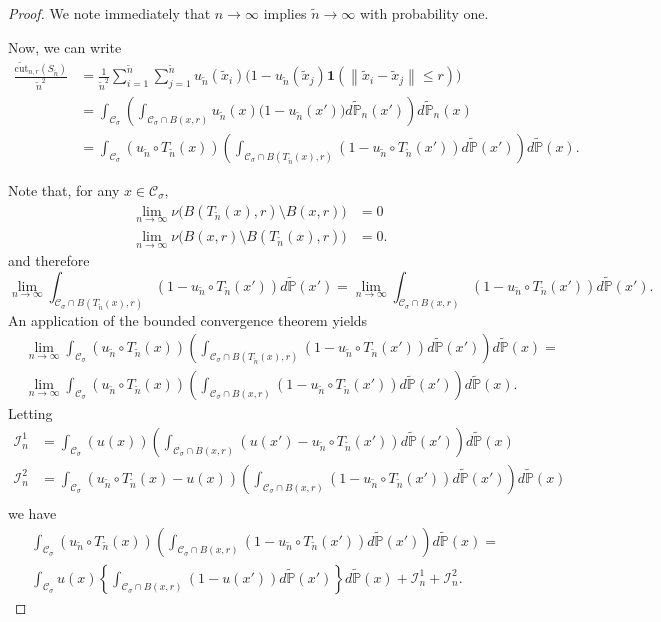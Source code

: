\documentclass{article}
\newcommand{\norm}[1]{\left\lVert#1\right\rVert}
\newcommand{\1}{\mathbf{1}}
\newcommand{\cut}{\mathrm{cut}}
\newcommand{\Pbb}{\mathbb{P}}
\newcommand{\Cset}{\mathcal{C}}
\newcommand{\Csig}{\Cset_{\sigma}}
\newcommand{\wn}{\widetilde{n}}
\newcommand{\wx}{\widetilde{x}}
\newcommand{\wPbb}{\widetilde{\Pbb}}
\theoremstyle{aldenthm}
\begin{document}
\begin{proof}
	We note immediately that $n \to \infty$ implies $\wn \to \infty$ with probability one.
	
	Now, we can write
	\begin{align*}
	 \frac{\widetilde{\cut}_{n,r}(S_{\wn})}{\wn^2} & = \frac{1}{\wn^2} \sum_{i = 1}^{\wn} \sum_{j = 1}^{\wn} u_{\wn}(\wx_i) \bigl( 1 - u_{\wn}(\wx_j) \1(\norm{\wx_i - \wx_j} \leq r) \bigr)  \\
	& = \int_{\Csig} \left(\int_{\Csig \cap B(x,r)} u_{\wn}(x) \bigl( 1 - u_{\wn}(x') \bigr) d\wPbb_n(x') \right) d\wPbb_n(x) \\
	& = \int_{\Csig} \left(u_{\wn} \circ T_{\wn}(x)\right) \left(\int_{\Csig \cap B(T_{\wn}(x),r)}  \left(1 - u_{\wn} \circ T_{\wn}(x') \right) d\wPbb(x') \right) d\wPbb(x).
	\end{align*}
	
	Note that, for any $x \in \Csig$,
	\begin{align*}
	\lim_{n \to \infty} \nu\bigl(B(T_{\wn}(x),r) \setminus B(x,r)\bigr) & = 0 \\
	\lim_{n \to \infty} \nu\bigl(B(x,r) \setminus B(T_{\wn}(x),r)\bigr) & = 0.
	\end{align*}
	and therefore
	\begin{equation*}
	\lim_{n \to \infty} \int_{\Csig \cap B(T_{\wn}(x),r)} \left(1 - u_{\wn} \circ T_{\wn}(x') \right) d\wPbb(x') = \lim_{n \to \infty} \int_{\Csig \cap B(x,r)}  \left(1 - u_{\wn} \circ T_{\wn}(x')\right) d\wPbb(x').
	\end{equation*}
	An application of the bounded convergence theorem yields
	\begin{align*}
	& \lim_{n \to \infty} \int_{\Csig} \left(u_{\wn} \circ T_{\wn}(x)\right) \left(\int_{\Csig \cap B(T_{\wn}(x),r)}  \left(1 - u_{\wn} \circ T_{\wn}(x') \right) d\wPbb(x') \right) d\wPbb(x) = \nonumber \\
	& \lim_{n \to \infty} \int_{\Csig} \left(u_{\wn} \circ T_{\wn}(x)\right) \left(\int_{\Csig \cap B(x,r)}  \left( 1 - u_{\wn} \circ T_{\wn}(x') \right) d\wPbb(x') \right) d\wPbb(x).
	\end{align*}
	Letting
	\begin{align*}
	\mathcal{I}_n^1 & = \int_{\Csig} \left(u(x)\right) \left(\int_{\Csig \cap B(x,r)}  \left( u(x') - u_{\wn} \circ T_{\wn}(x') \right) d\wPbb(x') \right) d\wPbb(x) \\
	\mathcal{I}_n^2 & = \int_{\Csig} \left(u_{\wn} \circ T_{\wn}(x) - u(x)\right) \left(\int_{\Csig \cap B(x,r)}  \left(1 - u_{\wn} \circ T_{\wn}(x') \right) d\wPbb(x') \right) d\wPbb(x) \\
	\end{align*}
	we have
	\begin{align}
	\label{eqn: pointwise_convergence_1}
	& \int_{\Csig} \left(u_{\wn} \circ T_{\wn}(x)\right) \left(\int_{\Csig \cap B(x,r)}  \left( 1 - u_{\wn} \circ T_{\wn}(x') \right) d\wPbb(x') \right) d\wPbb(x) = \nonumber \\
	& \int_{\Csig} u(x) \left\{ \int_{\Csig \cap B(x,r)} (1 - u(x')) d\wPbb(x') \right\} d\wPbb(x) + \mathcal{I}_n^1 + \mathcal{I}_n^2. 
	\end{align}
	

\end{proof}
\end{document}
